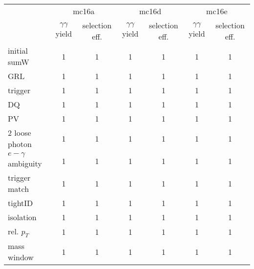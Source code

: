 \begin{table}[htbp]
\begin{center}
\begin{tabular}{l|cccccc}
\hline
                     & \multicolumn{2}{c}{mc16a}             & \multicolumn{2}{c}{mc16d}             & \multicolumn{2}{c}{mc16e}             \\
                     & $\gamma\gamma$ yield & selection eff. & $\gamma\gamma$ yield & selection eff. & $\gamma\gamma$ yield & selection eff. \\ \hline
initial sumW         & 1                    & 1              & 1                    & 1              & 1                    & 1              \\
GRL                  & 1                    & 1              & 1                    & 1              & 1                    & 1              \\
trigger              & 1                    & 1              & 1                    & 1              & 1                    & 1              \\
DQ                   & 1                    & 1              & 1                    & 1              & 1                    & 1              \\
PV                   & 1                    & 1              & 1                    & 1              & 1                    & 1              \\
2 loose photon       & 1                    & 1              & 1                    & 1              & 1                    & 1              \\
$e-\gamma$ ambiguity & 1                    & 1              & 1                    & 1              & 1                    & 1              \\
trigger match        & 1                    & 1              & 1                    & 1              & 1                    & 1              \\
tightID              & 1                    & 1              & 1                    & 1              & 1                    & 1              \\
isolation            & 1                    & 1              & 1                    & 1              & 1                    & 1              \\
rel. $p_{T}$         & 1                    & 1              & 1                    & 1              & 1                    & 1              \\
mass window          & 1                    & 1              & 1                    & 1              & 1                    & 1              \\

\end{tabular}
\end{center}
\end{table}
